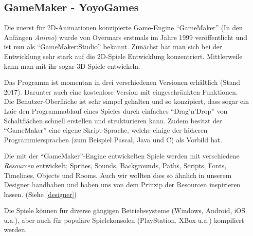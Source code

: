 \subsection{GameMaker - YoyoGames}

Die zuerst für 2D-Animationen konzipierte Game-Engine "`GameMaker"' (In den Anfängen \textit{Animo}) wurde von Overmars erstmals im Jahre 1999 veröffentlicht und ist nun als "`GameMaker:Studio"' bekannt. Zunächst hat man sich bei der Entwicklung sehr stark auf die 2D-Spiele Entwicklung konzentriert. Mittlerweile kann man mit ihr sogar 3D-Spiele entwickeln. 

Das Programm ist momentan in drei verschiedenen Versionen erhältlich (Stand 2017). Darunter auch eine kostenlose Version mit eingeschränkten Funktionen.
Die Benutzer-Oberfläche ist sehr simpel gehalten und so konzipiert, dass sogar ein Laie den Programmablauf eines Spieles durch einfaches "`Drag'n'Drop"' von Schaltflächen schnell erstellen und strukturieren kann. Zudem besitzt der "`GameMaker"' eine eigene Skript-Sprache, welche einige der höheren Programmiersprachen (zum Beispiel Pascal, Java und C)  als Vorbild hat.

Die mit der "`GameMaker"'-Engine entwickelten Spiele werden mit verschiedene \textit{Resourcen} entwickelt;
Sprites, Sounds, Backgrounds, Paths, Scripts, Fonts, Timelines, Objects und Rooms. 
Auch wir wollten dies so ähnlich in unserem Designer handhaben und haben uns von dem Prinzip der Resourcen inspirieren lassen. (Siehe \cref{designer})

Die Spiele können für diverse gängigen Betriebssysteme (Windows, Android, iOS u.a.), aber auch für populäre Spielekonsolen (PlayStation, XBox u.a.) kompiliert werden. 
